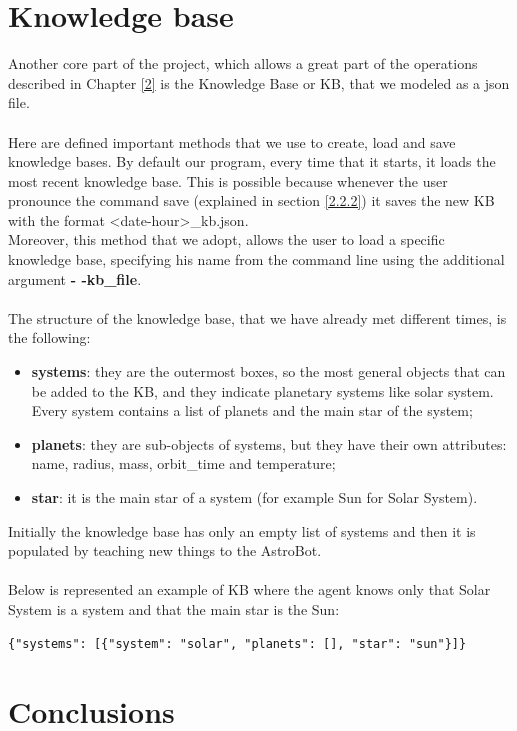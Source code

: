 \documentclass[12pt, a4paper]{article}
\begin{document}
\section{Knowledge base}
Another core part of the project, which allows a great part of the operations described in Chapter \ref{2} is the Knowledge Base or KB, that we modeled as a json file.
\\\\Here are defined important methods that we use to create, load and save knowledge bases.
By default our program, every time that it starts, it loads the most recent knowledge base. This is possible because whenever the user pronounce the command save (explained in section \ref{2.2.2}) it saves the new KB with the format <date-hour>\_kb.json.
\\Moreover, this method that we adopt, allows the user to load a specific knowledge base, specifying his name from the command line using the additional argument \textbf{- -kb\_file}.
\\\\The structure of the knowledge base, that we have already met different times, is the following:
\begin{itemize}
\item \textbf{systems}: they are the outermost boxes, so the most general objects that can be added to the KB, and they indicate planetary systems like solar system. Every system contains a list of planets and the main star of the system;
\item \textbf{planets}: they are sub-objects of systems, but they have their own attributes: name, radius, mass, orbit\_time and temperature;
\item \textbf{star}: it is the main star of a system (for example Sun for Solar System).
\end{itemize}
Initially the knowledge base has only an empty list of systems and then it is populated by teaching new things to the AstroBot.
\\\\Below is represented an example of KB where the agent knows only that Solar System is a system and that the main star is the Sun:
\begin{lstlisting}
{"systems": [{"system": "solar", "planets": [], "star": "sun"}]}
\end{lstlisting}

\section{Conclusions}
\end{document}
